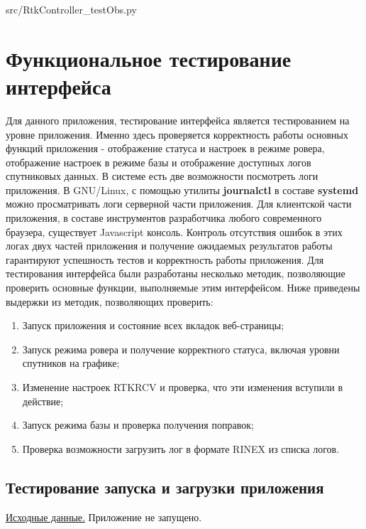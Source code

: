
{src/RtkController_testObs.py}

\section{Функциональное тестирование интерфейса} \label{sect4_2}

Для данного приложения, тестирование интерфейса является тестированием на уровне приложения. Именно здесь проверяется корректность работы основных функций приложения - отображение статуса и настроек в режиме ровера, отображение настроек в режиме базы и отображение доступных логов спутниковых данных. В системе есть две возможности посмотреть логи приложения. В GNU/Linux, с помощью утилиты \textbf{journalctl} в составе \textbf{systemd} можно просматривать логи серверной части приложения. Для клиентской части приложения, в составе инструментов разработчика любого современного браузера, существует Javascript консоль. Контроль отсутствия ошибок в этих логах двух частей приложения и получение ожидаемых результатов работы гарантируют успешность тестов и корректность работы приложения. Для тестирования интерфейса были разработаны несколько методик, позволяющие проверить основные функции, выполняемые этим интерфейсом. Ниже приведены выдержки из методик, позволяющих проверить:

\begin{enumerate}
  \item Запуск приложения и состояние всех вкладок веб-страницы;
  \item Запуск режима ровера и получение корректного статуса, включая уровни спутников на графике;
  \item Изменение настроек RTKRCV и проверка, что эти изменения вступили в действие;
  \item Запуск режима базы и проверка получения поправок;
  \item Проверка возможности загрузить лог в формате RINEX из списка логов.
\end{enumerate}


\subsection{Тестирование запуска и загрузки приложения} \label{subsect4_2_1}

\underline{Исходные данные.} Приложение не запущено.

